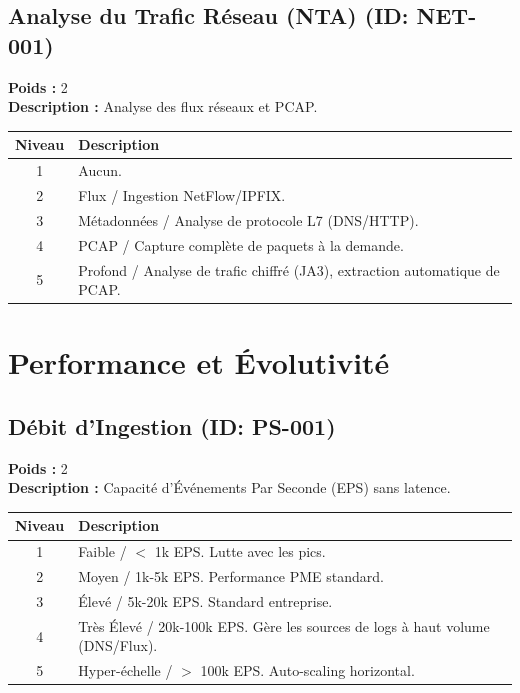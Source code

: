 \documentclass{article}
\begin{document}
\subsection{Analyse du Trafic Réseau (NTA) (ID: NET-001)}
\textbf{Poids :} 2 \\
\textbf{Description :} Analyse des flux réseaux et PCAP.
\vspace{0.3cm}
\begin{longtable}{|c|p{12cm}|}
\hline
\rowcolor{lightgray} \textbf{Niveau} & \textbf{Description} \\ \hline
1 & Aucun. \\ \hline
2 & Flux / Ingestion NetFlow/IPFIX. \\ \hline
3 & Métadonnées / Analyse de protocole L7 (DNS/HTTP). \\ \hline
4 & PCAP / Capture complète de paquets à la demande. \\ \hline
5 & Profond / Analyse de trafic chiffré (JA3), extraction automatique de PCAP. \\ \hline
\end{longtable}
\vspace{0.5cm}
\section{Performance et Évolutivité}
\subsection{Débit d'Ingestion (ID: PS-001)}
\textbf{Poids :} 2 \\
\textbf{Description :} Capacité d'Événements Par Seconde (EPS) sans latence.
\vspace{0.3cm}
\begin{longtable}{|c|p{12cm}|}
\hline
\rowcolor{lightgray} \textbf{Niveau} & \textbf{Description} \\ \hline
1 & Faible / $<$ 1k EPS. Lutte avec les pics. \\ \hline
2 & Moyen / 1k-5k EPS. Performance PME standard. \\ \hline
3 & Élevé / 5k-20k EPS. Standard entreprise. \\ \hline
4 & Très Élevé / 20k-100k EPS. Gère les sources de logs à haut volume (DNS/Flux). \\ \hline
5 & Hyper-échelle / $>$ 100k EPS. Auto-scaling horizontal. \\ \hline
\end{longtable}
\vspace{0.5cm}
\end{document}

